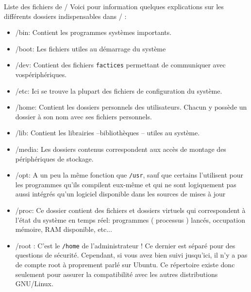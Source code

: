 \documentclass[10pt]{beamer}
\begin{document}
\begin{frame}{Liste des fichiers de /}
Voici   pour   information   quelques   explications   sur   les   différents   dossiers
indispensables dans / :
\begin{itemize}
\item \alert{/bin}: Contient les programmes systèmes importants.
\item \alert{/boot}: Les fichiers utiles au démarrage du système
\item \alert{/dev}: Contient des fichiers \texttt{factices} permettant de communiquer avec
vospériphériques.
\item \alert{/etc}: Ici se trouve la plupart des fichiers de configuration du système.
\item \alert{/home}: Contient les dossiers personnels des utilisateurs. Chacun y possède un dossier à son nom avec ses fichiers personnels.
\item \alert{/lib}: Contient les librairies –bibliothèques – utiles au système.
\item \alert{/media}: Les dossiers contenus correspondent aux accès de montage des périphériques de stockage.
\end{itemize}
\end{frame}
\begin{frame}
\begin{itemize}
\item  \alert{/opt}: A un peu la même fonction que \texttt{/usr}, sauf que certains l'utilisent pour
les programmes qu'ils compilent eux-même et qui ne sont logiquement pas
aussi intégrés qu'un logiciel disponible dans les sources de mises à jour 
\item \alert{/proc}: Ce dossier contient des fichiers et dossiers virtuels qui correspondent à l'état du système en temps réel: programmes ( processus ) lancés, occupation mémoire, RAM disponible, etc...
\item \alert{/root} : C’est le \texttt{/home} de l’administrateur ! Ce dernier est séparé pour des
questions de sécurité. Cependant, si vous avez bien suivi jusqu'ici, il n'y a
pas de compte root à proprement parlé sur Ubuntu. Ce répertoire existe
donc seulement pour assurer la compatibilité avec les autres distributions
GNU/Linux.
\end{itemize}
\end{frame}
\end{document}
